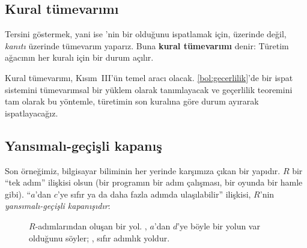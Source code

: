 \subsection{Kural tümevarımı}

Tersini göstermek, yani  ise 'nin bir  olduğunu
ispatlamak için,  üzerinde değil,  \emph{kanıtı} üzerinde
tümevarım yaparız. Buna \textbf{kural tümevarımı} denir: Türetim ağacının
her kuralı için bir durum açılır.


\noindent Kural tümevarımı, Kısım~III'ün temel aracı olacak.
\cref{bol:gecerlilik}'de bir ispat sistemini tümevarımsal bir yüklem
olarak tanımlayacak ve geçerlilik teoremini tam olarak bu yöntemle,
türetimin son kuralına göre durum ayırarak ispatlayacağız.

\subsection{Yansımalı-geçişli kapanış}

Son örneğimiz, bilgisayar biliminin her yerinde karşımıza çıkan bir
yapıdır. $R$ bir ``tek adım'' ilişkisi olsun (bir programın bir adım
çalışması, bir oyunda bir hamle gibi). ``$a$'dan $c$'ye sıfır ya da daha
fazla adımda ulaşılabilir'' ilişkisi, $R$'nin \emph{yansımalı-geçişli
kapanışıdır}:


\begin{figure}[htbp]
\centering
{}
\caption{$R$-adımlarından oluşan bir yol. , $a$'dan $d$'ye
böyle bir yolun var olduğunu söyler; , sıfır adımlık yoldur.}
\label{fig:kapanis}
\end{figure}

